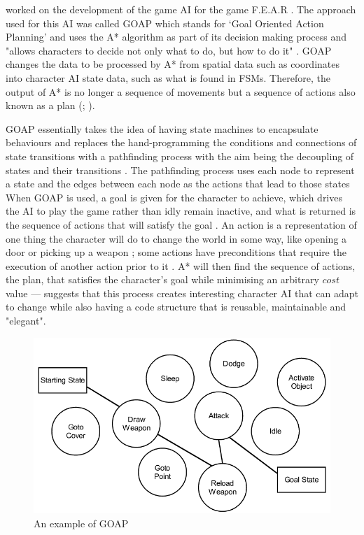 \documentclass[11pt, a4paper]{report}
\begin{document}
\citeauthor{orkin2006three} \parencite*[1]{orkin2006three} worked on the development of the game AI for the game F.E.A.R \parencite{FEAR}. The approach used for this AI was called GOAP which stands for `Goal Oriented Action Planning' and uses the A* algorithm as part of its decision making process and "allows characters to decide not only what to do, but how to do it" \parencite[1]{orkin2003applying}. GOAP changes the data to be processed by A* from spatial data such as coordinates into character AI state data, such as what is found in FSMs. Therefore, the output of A* is no longer a sequence of movements but a sequence of actions also known as a plan (\cite[2]{orkin2003applying}; \cite[6]{tozour2002evolution}).

GOAP essentially takes the idea of having state machines to encapsulate behaviours and replaces the hand-programming the conditions and connections of state transitions with a pathfinding process with the aim being the decoupling of states and their transitions \parencite[2]{orkin2003applying}. The pathfinding process uses each node to represent a state and the edges between each node as the actions that lead to those states \parencite[7]{orkin2003applying} When GOAP is used, a goal is given for the character to achieve, which drives the AI to play the game rather than idly remain inactive, and what is returned is the sequence of actions that will satisfy the goal \parencite[1]{orkin2003applying}. An action is a representation of one thing the character will do to change the world in some way, like opening a door or picking up a weapon \parencite{orkin2003applying}; some actions have preconditions that require the execution of another action prior to it \parencite[5]{orkin2003applying}. A* will then find the sequence of actions, the plan, that satisfies the character's goal while minimising an arbitrary $cost$ value --- \citeauthor{orkin2003applying} \parencite*[4-5]{orkin2003applying} suggests that this process creates interesting character AI that can adapt to change while also having a code structure that is reusable, maintainable and "elegant".

\begin{figure}[h]
  \centering
  \includegraphics[width=12cm]{img/goap.png}
  \caption{An example of GOAP \parencite[3]{orkin2003applying}}
  \label{fig:goap}
\end{figure}
\end{document}
